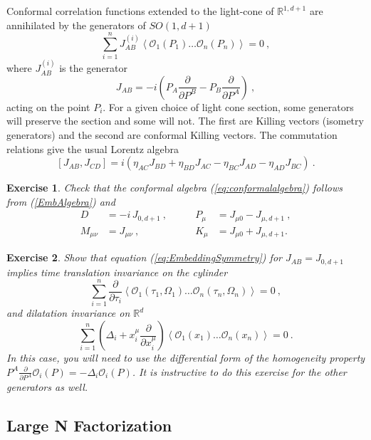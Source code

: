 \documentclass{ws-rv9x6}
\newtheorem{exercise}{Exercise}[section]
\newcommand\be{\begin{equation}}
\newcommand\ee{\end{equation}}
\begin{document}
Conformal correlation functions extended to the light-cone of $\mathbb{R}^{1,d+1}$
are annihilated by the generators of $SO(1,d+1)$
\begin{equation}
\sum_{i=1}^{n}J_{AB}^{(i)}\left\langle \mathcal{O}_{1}(P_{1})\dots\mathcal{O}_{n}(P_{n})\right\rangle =0\ ,\label{eq:EmbeddingSymmetry}
\end{equation}
where $J_{AB}^{(i)}$ is the generator 
\be
J_{AB}=-i\left(P_{A}\frac{\partial}{\partial P^{B}}-P_{B}\frac{\partial}{\partial P^{A}}\right)\ ,
\ee
acting on the point $P_{i}$. For a given choice of light cone section,
some generators will preserve the section and some will not. The first
are Killing vectors (isometry generators) and the second are conformal
Killing vectors. The commutation relations give the usual Lorentz
algebra
\be
\left[J_{AB},J_{CD}\right]=i\left(\eta_{AC}J_{BD}+\eta_{BD}J_{AC}-\eta_{BC}J_{AD}-\eta_{AD}J_{BC}\right)\ .
\label{EmbAlgebra}
\ee
\begin{exercise}
 Check that the conformal algebra (\ref{eq:conformalalgebra})
follows from  (\ref{EmbAlgebra}) and 
\begin{align}
D&=-i\, J_{0,d+1}\ ,\qquad &P_{\mu}&=J_{\mu0}-J_{\mu,d+1}\ , \nonumber\\
M_{\mu\nu}&=J_{\mu\nu}\ , &K_{\mu}&=J_{\mu0}+J_{\mu,d+1}.\label{eq:Embconformalgenerators}
\end{align}
\end{exercise}
\begin{exercise}
Show that equation (\ref{eq:EmbeddingSymmetry})
for $J_{AB}=J_{0,d+1}$ implies time translation invariance on the
cylinder
\be
\sum_{i=1}^{n}\frac{\partial}{\partial\tau_{i}}\left\langle \mathcal{O}_{1}(\tau_{1},\Omega_{1})\dots\mathcal{O}_{n}(\tau_{n},\Omega_{n})\right\rangle =0\ ,
\ee
and dilatation invariance on $\mathbb{R}^{d}$ 
\be
\sum_{i=1}^{n}\left(\Delta_{i}+x_{i}^{\mu}\frac{\partial}{\partial x_{i}^{\mu}}\right)\left\langle \mathcal{O}_{1}(x_{1})\dots\mathcal{O}_{n}(x_{n})\right\rangle =0\ .
\ee
In this case, you will need to use the differential form of the homogeneity property $P^{A}\frac{\partial}{\partial P^{A}}\mathcal{O}_{i}(P)=-\Delta_{i}\mathcal{O}_{i}(P)$.
It is instructive to do this exercise for the other generators as
well.
\end{exercise}






\subsection{Large N Factorization}
\end{document}
